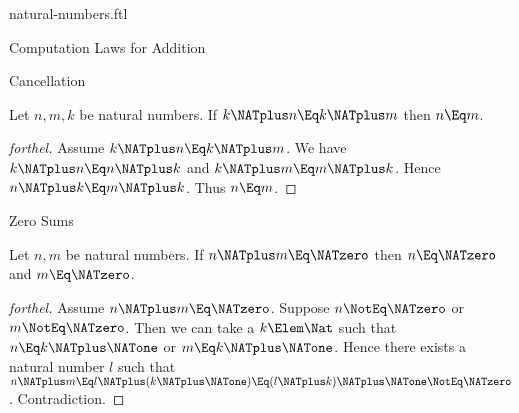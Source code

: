\documentclass{stex}
\begin{document}
\begin{smodule}{natural-numbers.ftl}
\begin{sfragment}{Computation Laws for Addition}
\begin{sfragment}{Cancellation}
    \begin{corollary}[forthel,id=ARITHMETIC_03_8445946379632640]
      Let $n, m, k$ be natural numbers.
      If $k \NATplus n \Eq k \NATplus m$ then $n \Eq m$.
    \end{corollary}
    \begin{proof}[forthel]
      Assume $k \NATplus n \Eq k \NATplus m$.
      We have $k \NATplus n \Eq n \NATplus k$ and $k \NATplus m \Eq m \NATplus k$.
      Hence $n \NATplus k \Eq m \NATplus k$.
      Thus $n \Eq m$.
    \end{proof}
  \end{sfragment}

  \begin{sfragment}{Zero Sums}
    \begin{proposition}[forthel,id=ARITHMETIC_03_3520602170195968]
      Let $n, m$ be natural numbers.
      If $n \NATplus m \Eq \NATzero$ then $n \Eq \NATzero$ and $m \Eq \NATzero$.
    \end{proposition}
    \begin{proof}[forthel]
      Assume $n \NATplus m \Eq \NATzero$.
      Suppose $n \NotEq \NATzero$ or $m \NotEq \NATzero$.
      Then we can take a $k \Elem \Nat$ such that $n \Eq k \NATplus \NATone$ or $m \Eq k \NATplus \NATone$.
      Hence there exists a natural number $l$ such that
      $n \NATplus m
        \Eq l \NATplus (k \NATplus \NATone)
        \Eq (l \NATplus k) \NATplus \NATone
        \NotEq \NATzero$.
      Contradiction.
    \end{proof}
  \end{sfragment}
\end{sfragment}
\end{smodule}
\end{document}
